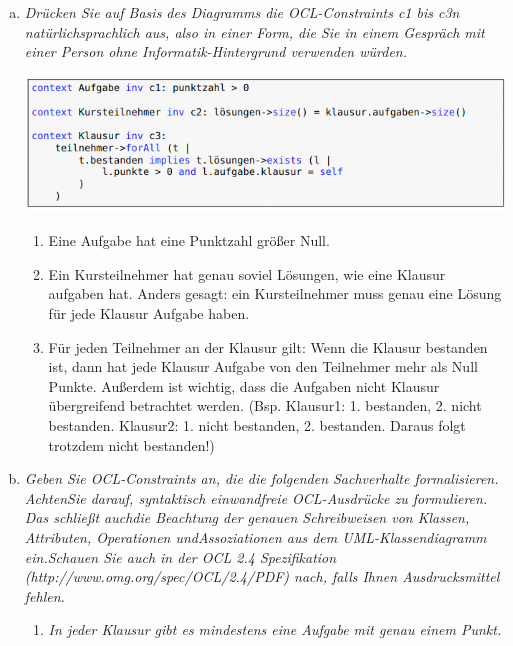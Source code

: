     
\begin{enumerate}[(a)]
    \item {\itshape Drücken Sie auf Basis des Diagramms die OCL-Constraints c1 bis c3n natürlichsprachlich  aus,  also  in  einer  Form,  die  Sie  in  einem  Gespräch  mit  einer  Person  ohne Informatik-Hintergrund verwenden würden.}
    
    \includegraphics[width=1\textwidth]{src/u9/task2/code.png}
    
    \begin{enumerate}[{c}1:]
        \item Eine Aufgabe hat eine Punktzahl größer Null.
        \item Ein Kursteilnehmer hat genau soviel Lösungen, wie eine Klausur aufgaben hat. Anders gesagt: ein Kursteilnehmer muss genau eine Lösung für jede Klausur Aufgabe haben.
        \item Für jeden Teilnehmer an der Klausur gilt: Wenn die Klausur bestanden ist, dann hat jede Klausur Aufgabe von den Teilnehmer mehr als Null Punkte. Außerdem ist wichtig, dass die Aufgaben nicht Klausur übergreifend betrachtet werden. (Bsp. Klausur1: 1. bestanden, 2. nicht bestanden. Klausur2: 1. nicht bestanden, 2. bestanden.
        Daraus folgt trotzdem nicht bestanden!)
    \end{enumerate}
    
    \item {\itshape Geben Sie OCL-Constraints an, die die folgenden Sachverhalte formalisieren. AchtenSie darauf, syntaktisch einwandfreie OCL-Ausdrücke zu formulieren. Das schließt auchdie Beachtung der genauen Schreibweisen von Klassen, Attributen, Operationen undAssoziationen aus dem UML-Klassendiagramm ein.Schauen Sie auch in der OCL 2.4 Spezifikation (http://www.omg.org/spec/OCL/2.4/PDF) nach, falls Ihnen Ausdrucksmittel fehlen.}
    \begin{enumerate}
        \item {\itshape In jeder Klausur gibt es mindestens eine Aufgabe mit genau einem Punkt.}
        
        

\end{enumerate}
\end{enumerate}
